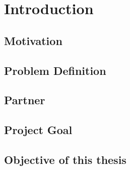 \chapter{Introduction}
\label{cha:introduction}

\section{Motivation}
\section{Problem Definition}
\section{Partner}
\section{Project Goal}
\section{Objective of this thesis}
